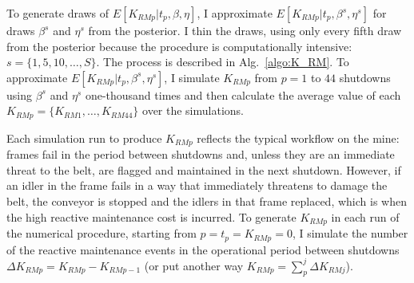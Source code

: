 To generate draws of $E[K_{RM p}|t_p,\beta,\eta]$, I approximate $E[K_{RM p}|t_p,\beta^s,\eta^s]$ for draws $\beta^s$ and $\eta^s$ from the posterior. I thin the draws, using only every fifth draw from the posterior because the procedure is computationally intensive: $s = \{1,5, 10, \dots, S\}$. The process is described in Alg.~\ref{algo:K_RM}. To approximate $E[K_{RM p}|t_p,\beta^s,\eta^s]$, I simulate $K_{RM p}$ from $p = 1$ to $44$ shutdowns using $\beta^s$ and $\eta^s$ one-thousand times and then calculate the average value of each $K_{RM p} = \{K_{RM 1}, \dots, K_{RM 44}\}$ over the simulations. 

Each simulation run to produce $K_{RM p}$ reflects the typical workflow on the mine: frames fail in the period between shutdowns and, unless they are an immediate threat to the belt, are flagged and maintained in the next shutdown. However, if an idler in the frame fails in a way that immediately threatens to damage the belt, the conveyor is stopped and the idlers in that frame replaced, which is when the high reactive maintenance cost is incurred. To generate $K_{RM p}$ in each run of the numerical procedure, starting from $p = t_p = K_{RM p} = 0$, I simulate the number of the reactive maintenance events in the operational period between shutdowns $\Delta K_{RM p} = K_{RM p} - K_{RM p-1}$ (or put another way $K_{RM p} = \sum_{p}^{j} \Delta K_{RM j}$). 

